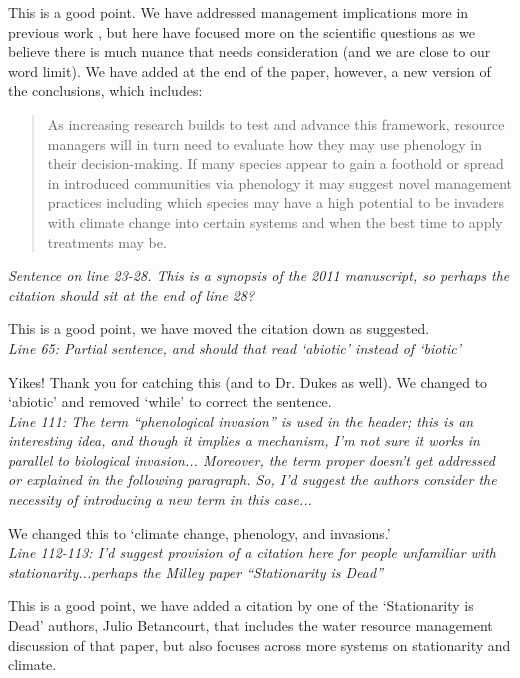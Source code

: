 \documentclass[11pt,a4paper]{letter}
\begin{document}
\begin{letter}{}
This is a good point. We have addressed management implications more in previous work \citep[see][]{wolkovich:2010fee}, but here have focused more on the scientific questions as we believe there is much nuance that needs consideration (and we are close to our word limit). We have added at the end of the paper, however, a new version of the conclusions, which includes:
\begin{quote}
As increasing research builds to test and advance this framework, resource managers will in turn need to evaluate how they may use phenology in their decision-making. If many species appear to gain a foothold or spread in introduced communities via phenology it may suggest novel management practices including which species may have a high potential to be invaders with climate change into certain systems and when the best time to apply treatments may be.
\end{quote}

\emph{Sentence on line 23-28. This is a synopsis of the 2011 manuscript, so perhaps the citation should sit at the end of line 28?}

This is a good point, we have moved the citation down as suggested.\\

\emph{Line 65: Partial sentence, and should that read `abiotic' instead of `biotic'}

Yikes! Thank you for catching this (and to Dr. Dukes as well). We changed to `abiotic' and removed `while' to correct the sentence.\\

\emph{Line 111: The term ``phenological invasion'' is used in the header; this is an interesting idea, and though it implies a mechanism, I'm not sure it works in parallel to biological invasion... Moreover, the term proper doesn't get addressed or explained in the following paragraph. So, I'd suggest the authors consider the necessity of introducing a new term in this case...}

We changed this to `climate change, phenology, and invasions.'\\

\emph{Line 112-113: I'd suggest provision of a citation here for people unfamiliar with stationarity...perhaps the Milley paper ``Stationarity is Dead''}

This is a good point, we have added a citation by one of the `Stationarity is Dead' authors, Julio Betancourt, that includes the water resource management discussion of that paper, but also focuses across more systems on stationarity and climate.\\


\end{letter}
\end{document}
